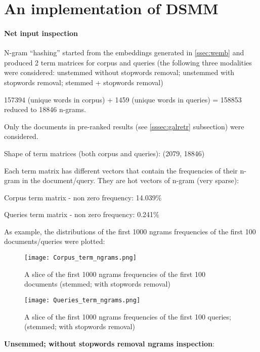 \newpage
\chapter{An implementation of DSMM}

\subsubsection{Net input inspection}

N-gram ``hashing'' started from the embeddings generated in \ref{ssec:wemb} and
produced 2 term matrices for corpus and queries (the following three modalities
were considered: unstemmed without stopwords removal; unstemmed with stopwords
removal; stemmed + stopwords removal)

157394 (unique words in corpus) + 1459 (unique words in queries) = 158853
reduced to 18846 n-grams.

Only the documents in pre-ranked results (see \ref{sssec:galretr} subsection)
were considered.

Shape of term matrices (both corpus and queries): (2079, 18846)

Each term matrix has different vectors that contain the frequencies of their
n-gram in the document/query. They are hot vectors of n-gram (very sparse):

Corpus term matrix - non zero frequency: 14.039\%

Queries term matrix - non zero frequency: 0.241\%

As example, the distributions of the first 1000 ngrams frequencies of the first
100 documents/queries were plotted:

\begin{figure}[H]
  \centering
  \texttt{[image: Corpus\_term\_ngrams.png]}
  \caption{A slice of the first 1000 ngrams frequencies of the first 100
documents (stemmed; with stopwords removal)}
  \label{fig:ngrams_corpus}
\end{figure}

\begin{figure}[H]
  \centering
  \texttt{[image: Queries\_term\_ngrams.png]}
  \caption{A slice of the first 1000 ngrams frequencies of the first 100
queries; (stemmed; with stopwords removal)}
  \label{fig:ngrams_queries}
\end{figure}

\textbf{Unsemmed; without stopwords removal ngrams inspection}:\\

